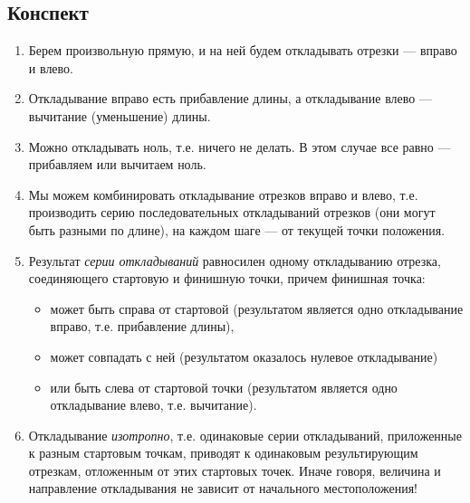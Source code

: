 \subsection{Конспект}
\begin{enumerate}\setlength{\itemsep}{1pt}
\item Берем произвольную прямую, и на ней будем откладывать отрезки --- вправо и влево.
\item Откладывание вправо есть прибавление длины, а откладывание влево --- вычитание (уменьшение) длины.
\item Можно откладывать ноль, т.е. ничего не делать. В этом случае все равно --- прибавляем или вычитаем ноль.
\item Мы можем комбинировать откладывание отрезков вправо и влево, т.е. производить серию последовательных откладываний отрезков (они могут быть разными по длине), на каждом шаге --- от текущей точки положения.
\item Результат \textit{серии откладываний} равносилен одному откладыванию отрезка, соединяющего стартовую и финишную точки, причем финишная точка:
\begin{itemize}
\item может быть справа от стартовой (результатом является одно откладывание вправо, т.е. прибавление длины),
\item может совпадать с ней (результатом оказалось нулевое откладывание)
\item или быть слева от стартовой точки (результатом является одно откладывание влево, т.е. вычитание).
\end{itemize}
\item Откладывание \textit{изотропно}, т.е. одинаковые серии откладываний, приложенные к разным стартовым точкам, приводят к одинаковым результирующим отрезкам, отложенным от этих стартовых точек. Иначе говоря, величина и направление откладывания не зависит от начального местоположения!
\end{enumerate}
